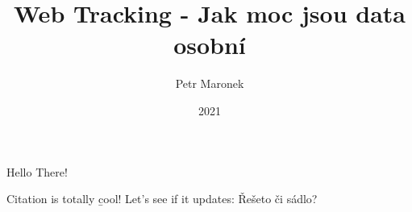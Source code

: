 \documentclass[12pt, a4paper]{article}
\title{Web Tracking - Jak moc jsou data osobní}
\author{Petr Maronek}
\date{2021}
\begin{document}
\maketitle

Hello There!

Citation is \cite{tolkientt} totally \b{cool}! Let's see if it updates: Řešeto či
sádlo?

\printbibliography
\end{document}
